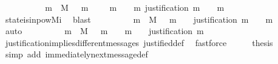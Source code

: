 \begin{isabellebody}
%
\isadelimproof
%
\endisadelimproof
%
\isatagproof
{}\isamarkupfalse%
\ {\isacharminus}\ \isanewline
\ \ \isamarkupfalse%
\ {\isachardoublequoteopen}{\isasymforall}\ {\isasymsigma}\ {\isasymin}{\isasymSigma}{\isachardot}\ {\isasymforall}\ m\ {\isasymin}\ M{\isachardot}\ {\isasymsigma}\ {\isasymunion}\ {\isacharbraceleft}m{\isacharbraceright}\ {\isasymin}\ {\isasymSigma}\ {\isasymlongrightarrow}\ {\isacharparenleft}{\isasymforall}\ m{\isacharprime}\ {\isasymin}\ {\isasymsigma}\ {\isasymunion}\ {\isacharbraceleft}m{\isacharbraceright}{\isachardot}\ justification\ m{\isacharprime}\ {\isasymsubseteq}\ {\isasymsigma}\ {\isasymunion}\ {\isacharbraceleft}m{\isacharbraceright}{\isacharparenright}{\isachardoublequoteclose}\isanewline
\ \ \ \ \isamarkupfalse%
\ state{\isacharunderscore}is{\isacharunderscore}in{\isacharunderscore}pow{\isacharunderscore}M{\isacharunderscore}i\ \isamarkupfalse%
\ blast\isanewline
\ \ \isamarkupfalse%
\ \isamarkupfalse%
\ {\isachardoublequoteopen}{\isasymforall}\ {\isasymsigma}\ {\isasymin}{\isasymSigma}{\isachardot}\ {\isasymforall}\ m\ {\isasymin}\ M{\isachardot}\ {\isasymsigma}\ {\isasymunion}\ {\isacharbraceleft}m{\isacharbraceright}\ {\isasymin}\ {\isasymSigma}\ {\isasymlongrightarrow}\ justification\ m\ {\isasymsubseteq}\ {\isasymsigma}\ {\isasymunion}\ {\isacharbraceleft}m{\isacharbraceright}{\isachardoublequoteclose}\isanewline
\ \ \ \ \isamarkupfalse%
\ auto\isanewline
\ \ \isamarkupfalse%
\ \isamarkupfalse%
\ {\isachardoublequoteopen}{\isasymforall}\ {\isasymsigma}\ {\isasymin}{\isasymSigma}{\isachardot}\ {\isasymforall}\ m\ {\isasymin}\ M{\isachardot}\ {\isasymsigma}\ {\isasymunion}\ {\isacharbraceleft}m{\isacharbraceright}\ {\isasymin}\ {\isasymSigma}\ {\isasymand}\ m\ {\isasymnotin}\ {\isasymsigma}\ {\isasymlongrightarrow}\ justification\ m\ {\isasymsubseteq}\ {\isasymsigma}{\isachardoublequoteclose}\isanewline
\ \ \ \ \isamarkupfalse%
\ justification{\isacharunderscore}implies{\isacharunderscore}different{\isacharunderscore}messages\ justified{\isacharunderscore}def\ \isamarkupfalse%
\ fastforce\isanewline
\ \ \isamarkupfalse%
\ \isamarkupfalse%
\ {\isacharquery}thesis\isanewline
\ \ \ \ \isamarkupfalse%
\ {\isacharparenleft}simp\ add{\isacharcolon}\ immediately{\isacharunderscore}next{\isacharunderscore}message{\isacharunderscore}def{\isacharparenright}\isanewline
{}\isamarkupfalse%

\end{isabellebody}
